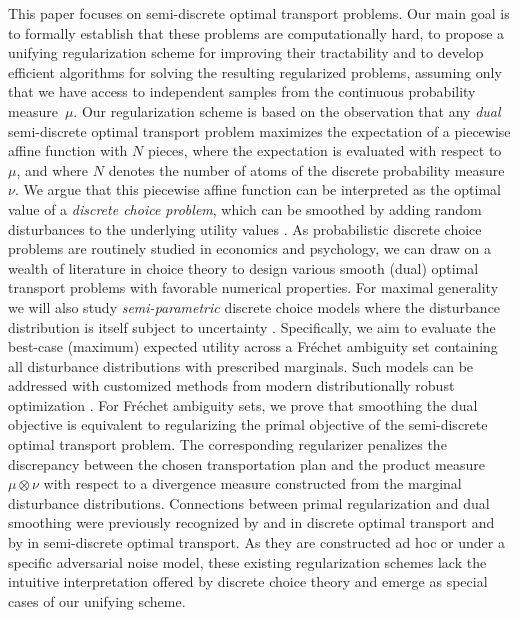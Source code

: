 \documentclass[11pt, a4paper, oneside, reqno]{article}
\begin{document}
	
	
	This paper focuses on semi-discrete optimal transport problems. Our main goal is to formally establish that these problems are computationally hard, to propose a unifying regularization scheme for improving their tractability and to develop efficient algorithms for solving the resulting regularized problems, {\color{black} assuming only that we have access to independent samples from the continuous probability measure~$\mu$}. Our regularization scheme is based on the observation that any {\em dual} semi-discrete optimal transport problem maximizes the expectation of a piecewise affine function with $N$ pieces, where the expectation is evaluated with respect to~$\mu$, and where $N$ denotes the number of atoms of the discrete probability measure~$\nu$. We argue that this piecewise affine function can be interpreted as the optimal value of a {\em discrete choice problem}, which can be smoothed by adding random disturbances to the underlying utility values \citep{thurstone1927law, mcfadden1973conditional}. As probabilistic discrete choice problems are routinely studied in economics and psychology, we can draw on a wealth of literature in choice theory to design various smooth (dual) optimal transport problems with favorable numerical properties. For maximal generality we will also study {\em semi-parametric} discrete choice models where the disturbance distribution is itself subject to uncertainty \citep{natarajan2009persistency, mishra2014theoretical, feng2017relation, ahipasaoglu2018convex}. Specifically, we aim to evaluate the best-case (maximum) expected utility across a Fr\'echet ambiguity set containing all disturbance distributions with prescribed marginals. Such models can be addressed with customized methods from modern distributionally robust optimization \citep{natarajan2009persistency}. For Fr\'echet ambiguity sets, we prove that smoothing the dual objective is equivalent to regularizing the primal objective of the semi-discrete optimal transport problem. The corresponding regularizer penalizes the discrepancy between the chosen transportation plan and the product measure~$\mu\otimes \nu$ with respect to a divergence measure constructed from the marginal disturbance distributions. Connections between primal regularization and dual smoothing were previously recognized by \citet{blondel2017smooth} and \citet{paty2020regularized} in discrete optimal transport and by \citet{genevay2016stochastic} in semi-discrete optimal transport. As they are constructed ad hoc or under a specific adversarial noise model, these existing regularization schemes lack the intuitive interpretation offered by discrete choice theory and emerge as special cases of our unifying scheme.
	
\end{document}
